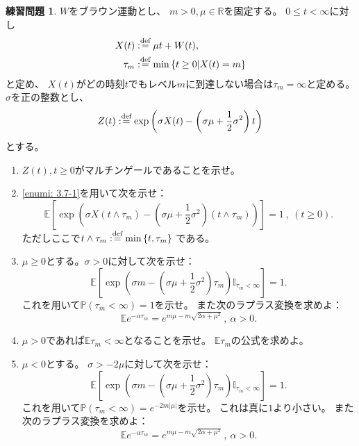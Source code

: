 \documentclass[uplatex]{jsarticle}
\theoremstyle{definition}
\newtheorem{prob}[prob]{練習問題}
\def\R{\mathbb{R}}
\def\P{\mathbb{P}}
\def\E{\mathbb{E}}
\def\I{\mathbb{I}}
\def\dfn{:\overset{\mbox{{\scriptsize def}}}{=}}
\begin{document}
\begin{prob}\label{prob: 3.7}
  \(W\)をブラウン運動とし、
  \(m > 0, \mu\in \R\)を固定する。
  \(0\leq t < \infty\)に対し
  \begin{align*}
    X(t) &\dfn \mu t + W(t) , \\
    \tau_m &\dfn \min\left\{ t\geq 0 \middle| X(t) = m \right\}
  \end{align*}
  と定め、
  \(X(t)\)がどの時刻\(t\)でもレベル\(m\)に到達しない場合は\(\tau_m=\infty\)と定める。
  \(\sigma\)を正の整数とし、
  \[
  Z(t) \dfn \exp \left( \sigma X(t)
  - \left( \sigma\mu + \frac{1}{2}\sigma^2\right) t\right)
  \]
  とする。
  \begin{enumerate}
    \item \label{enumi: 3.7-1}
    \(Z(t) , t\geq 0\)がマルチンゲールであることを示せ。
    \item \label{enumi: 3.7-2}
    \ref{enumi: 3.7-1}を用いて次を示せ：
    \[
    \E\left[ \exp\left(
    \sigma X(t\wedge\tau_m) - \left( \sigma\mu + \frac{1}{2}\sigma^2\right)
    (t\wedge\tau_m)
    \right)\right] = 1 \ , \ (t\geq 0).
    \]
    ただしここで\(t\wedge \tau_m \dfn \min \left\{ t,\tau_m\right\}\)
    である。
    \item \label{enumi: 3.7-3}
    \(\mu \geq 0\)とする。\(\sigma > 0\)に対して次を示せ：
    \[
    \E\left[ \exp\left(
    \sigma m - \left( \sigma\mu + \frac{1}{2}\sigma^2\right)\tau_m
    \right) \I_{\tau_m < \infty}\right] = 1.
    \]
    これを用いて\(\P(\tau_m<\infty) = 1\)を示せ。
    また次のラプラス変換を求めよ：
    \[
    \E e^{-\alpha\tau_m} = e^{m\mu - m\sqrt{2\alpha+\mu^2}} \
    , \ \alpha > 0.
    \]
    \item \label{enumi: 3.7-4}
    \(\mu > 0\)であれば\(\E\tau_m < \infty\)となることを示せ。
    \(\E\tau_m\)の公式を求めよ。
    \item \label{enumi: 3.7-5}
    \(\mu < 0\)とする。
    \(\sigma > -2\mu\)に対して次を示せ：
    \[
    \E\left[ \exp\left(
    \sigma m - \left( \sigma\mu + \frac{1}{2}\sigma^2\right)\tau_m
    \right) \I_{\tau_m < \infty}\right] = 1.
    \]
    これを用いて\(\P(\tau_m<\infty) = e^{-2m|\mu|}\)を示せ。
    これは真に\(1\)より小さい。
    また次のラプラス変換を求めよ：
    \[
    \E e^{-\alpha\tau_m} = e^{m\mu - m\sqrt{2\alpha+\mu^2}} \
    , \ \alpha > 0.
    \]
  \end{enumerate}
\end{prob}
\end{document}
